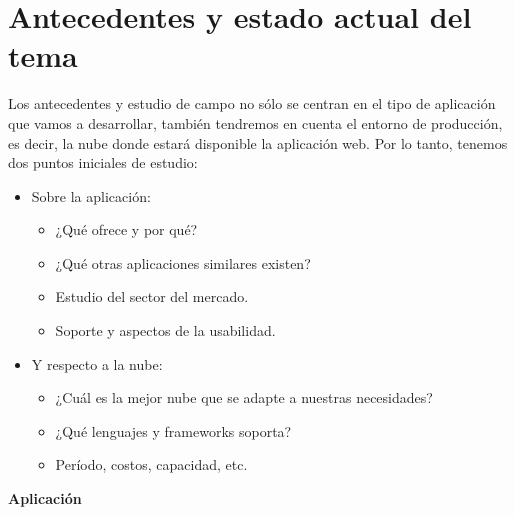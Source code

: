 \section{Antecedentes y estado actual del tema}\label{cap.1.2}
Los antecedentes y estudio de campo no sólo se centran en el tipo de aplicación que vamos a desarrollar, también tendremos en cuenta el entorno de producción, es decir, la nube donde estará disponible la aplicación web. Por lo tanto, tenemos dos puntos iniciales de estudio: 
\begin{itemize}
	\item Sobre la aplicación: 
	\begin{itemize}
		\item ¿Qué ofrece y por qué? 
		\item ¿Qué otras aplicaciones similares existen?
		\item Estudio del sector del mercado.
		\item Soporte y aspectos de la usabilidad.
	\end{itemize}

	\item Y respecto a la nube:
	\begin{itemize}
		\item ¿Cuál es la mejor nube que se adapte a nuestras necesidades?
		\item ¿Qué lenguajes y frameworks soporta?
		\item Período, costos, capacidad, etc.
	\end{itemize}
\end{itemize}

\vspace*{0.2in}
\begin{LARGE}
	\textbf {Aplicación}
\end{LARGE}

